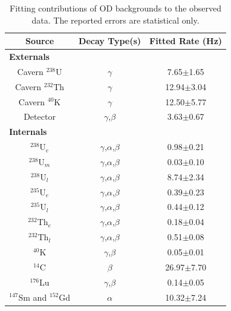 \begin{table}[!htbp]
    \centering
    \begin{tabular}{c|c|c}
        Source               &  Decay Type(s)               & Fitted Rate (Hz) \\ \hline
        \multicolumn{3}{l}{\textbf{Externals}} \\
        Cavern ${}^{238}$U   & $\gamma$                     & 7.65$\pm$1.65                    \\ 
        Cavern ${}^{232}$Th  & $\gamma$                     & 12.94$\pm$3.04                    \\ 
        Cavern ${}^{40}$K    & $\gamma$                     & 12.50$\pm$5.77                    \\ 
        Detector             & $\gamma$,$\beta$             & 3.63$\pm$0.67              \\ \hline
        \multicolumn{3}{l}{\textbf{Internals}} \\
        ${}^{238}$U$_{e}$     & $\gamma$,$\alpha$,$\beta$   & 0.98$\pm$0.21                    \\ 
        ${}^{238}$U$_{m}$     & $\gamma$,$\alpha$,$\beta$   & 0.03$\pm$0.10                   \\
        ${}^{238}$U$_{l}$     & $\gamma$,$\alpha$,$\beta$   & 8.74$\pm$2.34                \\
        ${}^{235}$U$_{e}$     & $\gamma$,$\alpha$,$\beta$   & 0.39$\pm$0.23                    \\
        ${}^{235}$U$_{l}$     & $\gamma$,$\alpha$,$\beta$   & 0.44$\pm$0.12                    \\
        ${}^{232}$Th$_{e}$    & $\gamma$,$\alpha$,$\beta$   & 0.18$\pm$0.04                    \\
        ${}^{232}$Th$_{l}$    & $\gamma$,$\alpha$,$\beta$   & 0.51$\pm$0.08                  \\
        ${}^{40}$K          & $\gamma$,$\beta$              & 0.05$\pm$0.01                 \\
        ${}^{14}$C          & $\beta$                       & 26.97$\pm$7.70           \\
        ${}^{176}$Lu        & $\gamma$,$\beta$              & 0.14$\pm$0.05               \\
        ${}^{147}$Sm and ${}^{152}$Gd    & $\alpha$         & 10.32$\pm$7.24                     
        
    \end{tabular}
    \caption{Fitting contributions of OD backgrounds to the observed data. The reported errors are statistical only.}
    \label{tab:od_constrainable_decays_in_data}
\end{table}

